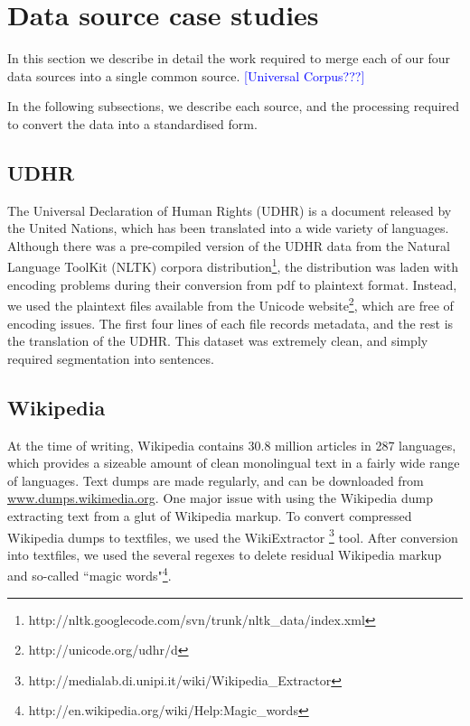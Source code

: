 \section{Data source case studies} \label{sec:case_studies}

In this section we describe in detail the work required to merge each of our four data sources into a single common source. \textcolor{blue}{[Universal Corpus???]}

In the following subsections, we describe each source, and the processing required to convert the data into a standardised form. 


\subsection{UDHR}


The Universal Declaration of Human Rights (UDHR) is a document released by the United Nations, which has been translated into a wide variety of languages. Although there was a pre-compiled version of the UDHR data from the Natural Language ToolKit (NLTK) corpora distribution\footnote{http://nltk.googlecode.com/svn/trunk/nltk\_data/index.xml}, the distribution was laden with encoding problems during their conversion from pdf to plaintext format. Instead, we used the plaintext files available from the Unicode website\footnote{http://unicode.org/udhr/d}, which are free of encoding issues. The first four lines of each file records metadata, and the rest is the translation of the UDHR. This dataset was extremely clean, and simply required segmentation into sentences.


\subsection{Wikipedia}


At the time of writing, Wikipedia contains 30.8 million articles in 287 languages, which provides a sizeable amount of clean monolingual text in a fairly wide range of languages. Text dumps are made regularly, and can be downloaded from \url{www.dumps.wikimedia.org}. One major issue with using the Wikipedia dump extracting text from a glut of Wikipedia markup. To convert compressed Wikipedia dumps to textfiles, we used the WikiExtractor \footnote{http://medialab.di.unipi.it/wiki/Wikipedia\_Extractor} tool. After conversion into textfiles, we used the several regexes to delete residual Wikipedia markup and so-called ``magic words"\footnote{http://en.wikipedia.org/wiki/Help:Magic\_words}.

